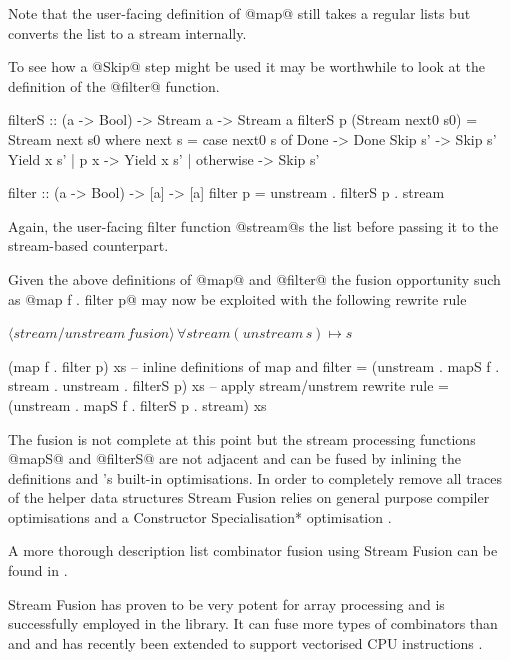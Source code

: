 \documentclass[preamble.tex]{subfiles}
\begin{document}
Note that the user-facing definition of @map@ still takes a regular lists but converts the list to a stream internally.

To see how a @Skip@ step might be used it may be worthwhile to look at the definition of the @filter@ function.

\begin{hscode}
filterS :: (a -> Bool) -> Stream a -> Stream a
filterS p (Stream next0 s0) = Stream next s0
  where next s = case next0 s of
    Done                   -> Done
    Skip    s'             -> Skip    s'
    Yield x s' | p x       -> Yield x s'
               | otherwise -> Skip    s'

filter :: (a -> Bool) -> [a] -> [a]
filter p = unstream . filterS p . stream
\end{hscode}

Again, the user-facing filter function @stream@s the list before passing it to the stream-based counterpart.

Given the above definitions of @map@ and @filter@ the fusion opportunity such as @map f . filter p@ may now be exploited with the following rewrite rule

$\langle stream/unstream\, fusion\rangle\,\forall stream(unstream\, s)\mapsto s$

\begin{hscode}
(map f . filter p) xs
  -- inline definitions of map and filter
  = (unstream . mapS f . stream . unstream . filterS p) xs
  -- apply stream/unstrem rewrite rule
  = (unstream . mapS f . filterS p . stream) xs
\end{hscode}

The fusion is not complete at this point but the stream processing functions @mapS@ and @filterS@ are not adjacent and can be fused by inlining the definitions and \GHC's built-in optimisations. In order to completely remove all traces of the helper data structures Stream Fusion relies on general purpose compiler optimisations and a \*Constructor Specialisation* optimisation \cite{SpecConstr}.

A more thorough description list combinator fusion using Stream Fusion can be found in \cite{CLS07}.

Stream Fusion has proven to be very potent for array processing and is successfully employed in the  library. It can fuse more types of combinators than  and  and has recently been extended to support vectorised CPU instructions \cite{VectorStreamFusion}.
\end{document}
